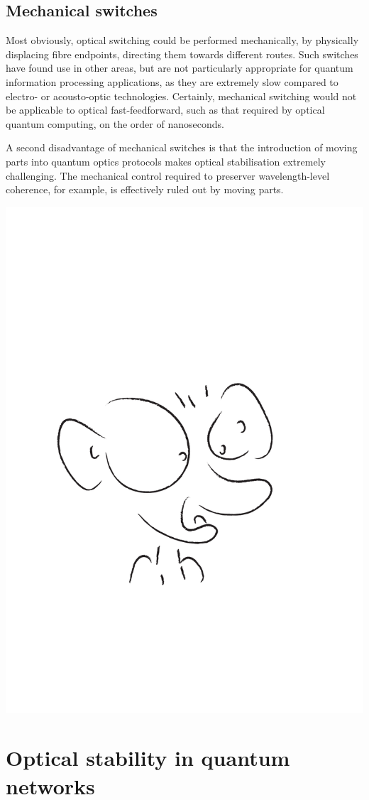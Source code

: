 \documentclass[aps, rmp, twocolumn, amsmath, amssymb, nofootinbib, superscriptaddress, longbibliography, floatfix, table-of-contents, eqsecnum]{revtex4-1}
\begin{document}
%
%

\subsection{Mechanical switches}

Most obviously, optical switching could be performed mechanically, by physically displacing fibre endpoints, directing them towards different routes. Such switches have found use in other areas, but are not particularly appropriate for quantum information processing applications, as they are extremely slow compared to electro- or acousto-optic technologies. Certainly, mechanical switching would not be applicable to optical fast-feedforward, such as that required by optical quantum computing, on the order of nanoseconds.

A second disadvantage of mechanical switches is that the introduction of moving parts into quantum optics protocols makes optical stabilisation extremely challenging. The mechanical control required to preserver wavelength-level coherence, for example, is effectively ruled out by moving parts.

\begin{center}
	\includegraphics[width=0.6\columnwidth]{sketch_22}
\end{center}

%
%

\section{Optical stability in quantum networks} \label{sec:opt_stab} 
\end{document}
